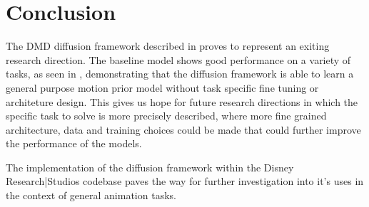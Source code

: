 \section{Conclusion}

The DMD diffusion framework described in  proves to represent an exiting research direction. The baseline model shows good performance on a variety of tasks, as seen in , demonstrating that the diffusion framework is able to learn a general purpose motion prior model without task specific fine tuning or architeture design. This gives us hope for future research directions in which the specific task to solve is more precisely described, where more fine grained architecture, data and training choices could be made that could further improve the performance of the models. 

The implementation of the diffusion framework within the Disney Research|Studios codebase paves the way for further investigation into it's uses in the context of general animation tasks.